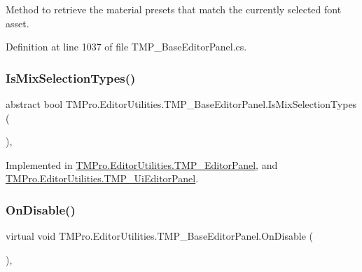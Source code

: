 Method to retrieve the material presets that match the currently selected font asset. 



Definition at line 1037 of file T\+M\+P\+\_\+\+Base\+Editor\+Panel.\+cs.

\mbox{\label{class_t_m_pro_1_1_editor_utilities_1_1_t_m_p___base_editor_panel_a2d01dae660062e1028c4b28f40689aa9}} 
\subsubsection{\texorpdfstring{IsMixSelectionTypes()}{IsMixSelectionTypes()}}
{\footnotesize\ttfamily abstract bool T\+M\+Pro.\+Editor\+Utilities.\+T\+M\+P\+\_\+\+Base\+Editor\+Panel.\+Is\+Mix\+Selection\+Types (\begin{DoxyParamCaption}{ }\end{DoxyParamCaption})\hspace{0.3cm}{\ttfamily [protected]}, {}}



Implemented in \mbox{\hyperlink{class_t_m_pro_1_1_editor_utilities_1_1_t_m_p___editor_panel_afd65387972f0d704f001c4563850e610}{T\+M\+Pro.\+Editor\+Utilities.\+T\+M\+P\+\_\+\+Editor\+Panel}}, and \mbox{\hyperlink{class_t_m_pro_1_1_editor_utilities_1_1_t_m_p___ui_editor_panel_abfd7483420d93f260bd25c932613f6db}{T\+M\+Pro.\+Editor\+Utilities.\+T\+M\+P\+\_\+\+Ui\+Editor\+Panel}}.

\mbox{\label{class_t_m_pro_1_1_editor_utilities_1_1_t_m_p___base_editor_panel_aef86582a22c23f9a5dd2236eb704aac7}} 
\subsubsection{\texorpdfstring{OnDisable()}{OnDisable()}}
{\footnotesize\ttfamily virtual void T\+M\+Pro.\+Editor\+Utilities.\+T\+M\+P\+\_\+\+Base\+Editor\+Panel.\+On\+Disable (\begin{DoxyParamCaption}{ }\end{DoxyParamCaption})\hspace{0.3cm}{\ttfamily [protected]}, {\ttfamily [virtual]}}



